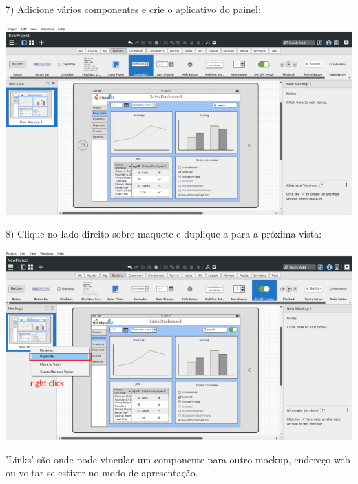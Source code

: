 \documentclass{tufte-book} %
\begin{document}
\break

7) Adicione vários componentes e crie o aplicativo do painel:

\begin{center}
	\includegraphics{img17.png}
\end{center}

8) Clique no lado direito sobre maquete e duplique-a para a próxima vista:

\begin{center}
	\includegraphics{img18.png}
\end{center}

'Links' são onde pode vincular um componente para outro mockup, endereço web ou voltar se estiver no modo de apresentação.
\end{document}
